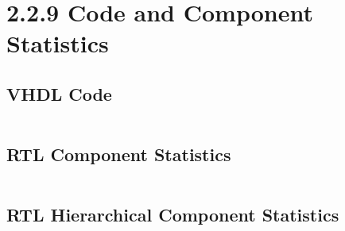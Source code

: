 \documentclass[11pt]{report}
\begin{document}
\section*{2.2.9 Code and Component Statistics}
\subsection*{VHDL Code}
\inputminted[firstline=23]{vhdl}{"../../Lab3TaskBP3/Lab3TaskBP3.srcs/sources_1/imports/sources_1/imports/Digital Engineering/Algorithm.vhd"}

\subsection*{RTL Component Statistics}
\inputminted[firstline=94, lastline=101]{text}{"../../Lab3TaskBP3/Lab3TaskBP3.runs/synth_1/algorithm.vds"}

\subsection*{RTL Hierarchical Component Statistics}
\inputminted[firstline=108, lastline=117]{text}{"../../Lab3TaskBP3/Lab3TaskBP3.runs/synth_1/algorithm.vds"}
\end{document}
